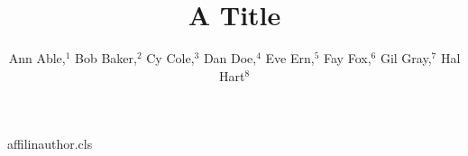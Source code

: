 \begin{filecontents*}[overwrite]{affilinauthor.cls}
\def\affilfont{\small}
\def\affil#1{\par{\reset@font\affilfont#1\par}}
\def\@maketitle{\newpage{\Large\bfseries\@title\par}\vskip1em\noindent{\bfseries\@author\par}\vskip1em}
\end{filecontents*}
\documentclass{affilinauthor}

\title{A Title}
\author{Ann Able,$^1$ Bob Baker,$^2$ Cy Cole,$^3$ Dan Doe,$^4$ Eve Ern,$^5$ Fay Fox,$^6$ Gil Gray,$^7$ Hal Hart$^8$
}
\maketitle
Body.

